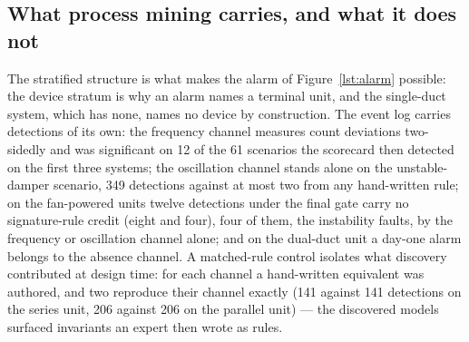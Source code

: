 \documentclass[11pt,letterpaper]{article}
\begin{document}
\subsection{What process mining carries, and what it does not}
\label{sec:pm}

The stratified structure is what makes the alarm of Figure~\ref{lst:alarm} possible: the device stratum is why an alarm names a terminal unit, and the single-duct system, which has none, names no device by construction. The event log carries detections of its own: the frequency channel measures count deviations two-sidedly and was significant on 12 of the 61 scenarios the scorecard then detected on the first three systems; the oscillation channel stands alone on the unstable-damper scenario, 349 detections against at most two from any hand-written rule; on the fan-powered units twelve detections under the final gate carry no signature-rule credit (eight and four), four of them, the instability faults, by the frequency or oscillation channel alone; and on the dual-duct unit a day-one alarm belongs to the absence channel. A matched-rule control isolates what discovery contributed at design time: for each channel a hand-written equivalent was authored, and two reproduce their channel exactly (141 against 141 detections on the series unit, 206 against 206 on the parallel unit) --- the discovered models surfaced invariants an expert then wrote as rules.
\end{document}
